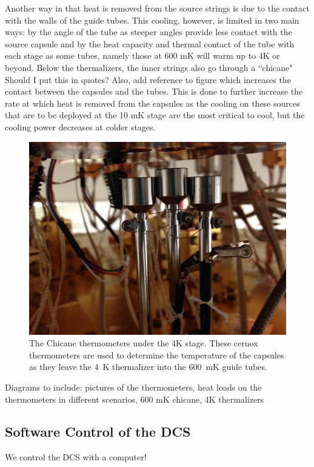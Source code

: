 Another way in that heat is removed from the source strings is due to the contact with the walls of the guide tubes. This cooling, however, is limited in two main ways: by the angle of the tube as steeper angles provide less contact with the source capsule and by the heat capacity and thermal contact of the tube with each stage as some tubes, namely those at 600 mK will warm up to 4K or beyond. Below the thermalizers, the inner strings also go through a ``chicane" \color{red} Should I put this in quotes? Also, add reference to figure\color{black} which increases the contact between the capsules and the tubes. This is done to further increase the rate at which heat is removed from the capsules as the cooling on these sources that are to be deployed at the 10 mK stage are the most critical to cool, but the cooling power decreases at colder stages. 

\begin{figure}[htbp]
    \centering
    \includegraphics[width=0.8\linewidth]{Figures/ChicaneThermometers.JPG}
    \caption[The chicane thermometers.]
    {The Chicane thermometers under the 4K stage.
    These cernox thermometers are used to determine the temperature of the capsules as they leave the 4~K thermalizer into the 600~mK guide tubes.}
    \label{fig:chicane_thermometers}
\end{figure}

Diagrams to include: pictures of the thermometers, heat loads on the thermometers in different scenarios, 600 mK chicane, 4K thermalizers


\subsection{Software Control of the DCS}
We control the DCS with a computer!

